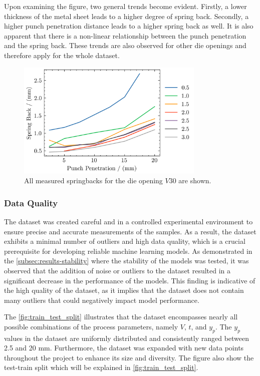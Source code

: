 Upon examining the figure, two general trends become evident.
Firstly, a lower thickness of the metal sheet leads to a higher degree of spring back.
Secondly, a higher punch penetration distance leads to a higher spring back as well.
It is also apparent that there is a non-linear relationship between the punch penetration and the spring back.
These trends are also observed for other die openings and therefore apply for the whole dataset.

\begin{figure}[h]
    \begin{tcolorbox}[arc=0pt,boxrule=0.5pt]
        \centering
        \includegraphics[width=0.8\textwidth]{chap4/images/all-springbacks-consolidated}
    \end{tcolorbox}
    \caption{All measured springbacks for the die opening $V30$ are shown. }
    \label{fig:v30_springbacks}
\end{figure}

\subsubsection{Data Quality}
The dataset was created careful and in a controlled experimental environment to ensure precise and accurate
measurements of the samples.
As a result, the dataset exhibits a minimal number of outliers and high data quality, which is a crucial prerequisite
for developing reliable machine learning models.
As demonstrated in the \cref{subsec:results-stability} where the stability of the models was tested, it
was observed
that the addition of noise or outliers to the dataset resulted in a significant decrease in the performance of the models.
This finding is indicative of the high quality of the dataset, as it implies that the dataset does not contain many
outliers that could negatively impact model performance.

The \cref{fig:train_test_split} illustrates that the dataset encompasses nearly all possible combinations of the
process parameters, namely $V$, $t$, and $y_p$.
The $y_p$ values in the dataset are uniformly distributed and consistently ranged between 2.5 and 20 mm.
Furthermore, the dataset was expanded with new data points throughout the project to enhance its size and
diversity.
The figure also show the test-train split which will be explained in \cref{fig:train_test_split}.

